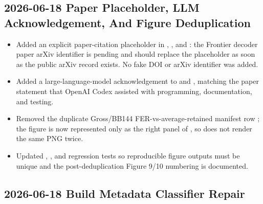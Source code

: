 \subsection*{2026-06-18 Paper Placeholder, LLM Acknowledgement, And Figure Deduplication}

\begin{itemize}
\item Added an explicit paper-citation placeholder in \texttt{}, \texttt{}, and \texttt{}: the Frontier decoder paper arXiv identifier is pending and should replace the placeholder as soon as the public arXiv record exists. No fake DOI or arXiv identifier was added.
\item Added a large-language-model acknowledgement to \texttt{} and \texttt{}, matching the paper statement that OpenAI Codex assisted with programming, documentation, and testing.
\item Removed the duplicate Gross/BB144 FER-vs-average-retained manifest row \texttt{}; the figure is now represented only as the right panel of \texttt{}, so \texttt{} does not render the same PNG twice.
\item Updated \texttt{}, \texttt{}, and regression tests so reproducible figure outputs must be unique and the post-deduplication Figure 9/10 numbering is documented.
\end{itemize}

\subsection*{2026-06-18 Build Metadata Classifier Repair}

